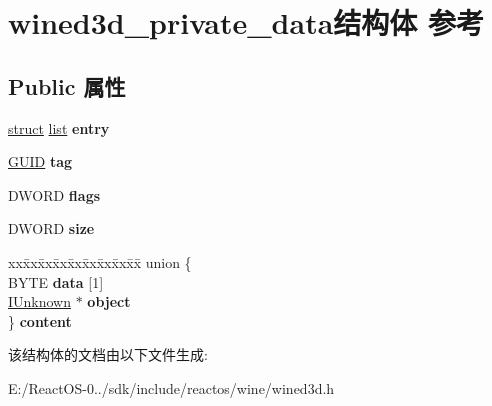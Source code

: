\hypertarget{structwined3d__private__data}{}\section{wined3d\+\_\+private\+\_\+data结构体 参考}
\label{structwined3d__private__data}
\subsection*{Public 属性}
\begin{DoxyCompactItemize}
\item 
\mbox{\label{structwined3d__private__data_aee82b337666d8fac521c7ffa5975dbad}} 
\hyperlink{interfacestruct}{struct} \hyperlink{classlist}{list} {\bfseries entry}
\item 
\mbox{\label{structwined3d__private__data_afc5560909a9427162251e8acc2731162}} 
\hyperlink{interface_g_u_i_d}{G\+U\+ID} {\bfseries tag}
\item 
\mbox{\label{structwined3d__private__data_abc3ac4dfba28dca9e2a62b09f8055a11}} 
D\+W\+O\+RD {\bfseries flags}
\item 
\mbox{\label{structwined3d__private__data_a2aeae1bcab30641b8c4ced7de74b9e32}} 
D\+W\+O\+RD {\bfseries size}
\item 
\mbox{\label{structwined3d__private__data_aebdc8790a2fe260a6edb9c0ee94545d2}} 
\begin{tabbing}
xx\=xx\=xx\=xx\=xx\=xx\=xx\=xx\=xx\=\kill
union \{\\
\>BYTE {\bfseries data} \mbox{[}1\mbox{]}\\
\>\hyperlink{interface_i_unknown}{IUnknown} $\ast$ {\bfseries object}\\
\} {\bfseries content}\\

\end{tabbing}\end{DoxyCompactItemize}


该结构体的文档由以下文件生成\+:\begin{DoxyCompactItemize}
\item 
E\+:/\+React\+O\+S-\/0../sdk/include/reactos/wine/wined3d.\+h\end{DoxyCompactItemize}
